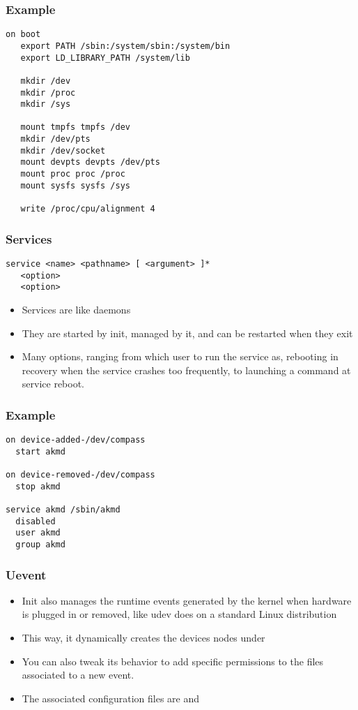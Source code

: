 \begin{frame}[fragile]
  \frametitle{Example}
\begin{verbatim}
on boot
   export PATH /sbin:/system/sbin:/system/bin
   export LD_LIBRARY_PATH /system/lib

   mkdir /dev
   mkdir /proc
   mkdir /sys

   mount tmpfs tmpfs /dev
   mkdir /dev/pts
   mkdir /dev/socket
   mount devpts devpts /dev/pts
   mount proc proc /proc
   mount sysfs sysfs /sys

   write /proc/cpu/alignment 4
\end{verbatim}
\end{frame}

\begin{frame}[fragile]
  \frametitle{Services}
\begin{verbatim}
service <name> <pathname> [ <argument> ]*
   <option>
   <option>
\end{verbatim}
  \begin{itemize}
  \item Services are like daemons
  \item They are started by init, managed by it, and can be restarted
    when they exit
  \item Many options, ranging from which user to run the service as,
    rebooting in recovery when the service crashes too frequently, to
    launching a command at service reboot.
  \end{itemize}
\end{frame}

\begin{frame}[fragile]
  \frametitle{Example}
\begin{verbatim}
on device-added-/dev/compass
  start akmd

on device-removed-/dev/compass
  stop akmd

service akmd /sbin/akmd
  disabled
  user akmd
  group akmd
\end{verbatim}
\end{frame}

\begin{frame}
  \frametitle{Uevent}
  \begin{itemize}
  \item Init also manages the runtime events generated by the kernel
    when hardware is plugged in or removed, like udev does on a standard
    Linux distribution
  \item This way, it dynamically creates the devices nodes under 
  \item You can also tweak its behavior to add specific permissions to 
    the files associated to a new event.
  \item The associated configuration files are  and
  \end{itemize}
\end{frame}

